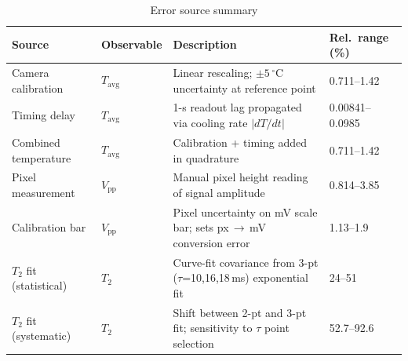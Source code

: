 \documentclass{article}
\begin{document}
\begin{table}[h]
\centering
\caption{Error source summary}
\begin{tabular}{|l|l|l|l|}
\hline
Source & Observable & Description & Rel.\ range (\%) \\ \hline
  Camera calibration & $T_\mathrm{avg}$ & Linear rescaling; $\pm5\,^\circ$C uncertainty at reference point & 0.711--1.42 \\ \hline
  Timing delay & $T_\mathrm{avg}$ & 1-s readout lag propagated via cooling rate $|dT/dt|$ & 0.00841--0.0985 \\ \hline
  Combined temperature & $T_\mathrm{avg}$ & Calibration + timing added in quadrature & 0.711--1.42 \\ \hline
  Pixel measurement & $V_\mathrm{pp}$ & Manual pixel height reading of signal amplitude & 0.814--3.85 \\ \hline
  Calibration bar & $V_\mathrm{pp}$ & Pixel uncertainty on mV scale bar; sets px\,$\to$\,mV conversion error & 1.13--1.9 \\ \hline
  $T_2$ fit (statistical) & $T_2$ & Curve-fit covariance from 3-pt ($\tau$=10,16,18\,ms) exponential fit & 24--51 \\ \hline
  $T_2$ fit (systematic) & $T_2$ & Shift between 2-pt and 3-pt fit; sensitivity to $\tau$ point selection & 52.7--92.6 \\ \hline
\end{tabular}
\end{table}
\end{document}

